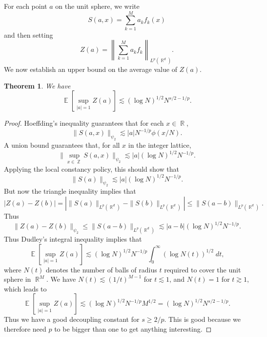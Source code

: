 \documentclass[dvipsnames,letterpaper,12pt]{article}
\numberwithin{equation}{section}
\DeclareMathOperator{\RR}{\mathbb{R}}
\DeclareMathOperator{\ZZ}{\mathbb{Z}}
\newtheorem{theorem}{Theorem}
\numberwithin{theorem}{section}
\DeclareMathOperator{\EE}{\mathbb{E}}
\begin{document}
For each point $a$ on the unit sphere, we write
%
\[ S(a,x) = \sum_{k = 1}^M a_k f_k(x) \]
%
and then setting
%
\[ Z(a) = \left\| \sum_{k = 1}^M a_k f_k \right\|_{L^p(\RR^d)}. \]
%
We now establish an upper bound on the average value of $Z(a)$.

\begin{theorem}
    We have
    \[ \EE[\sup_{|a| = 1} Z(a)] \lesssim (\log N)^{1/2} N^{s/2 - 1/p}. \]
\end{theorem}
\begin{proof}
    Hoeffding's inequality guarantees that for each $x \in \RR$,
    \[ \| S(a,x) \|_{\psi_2} \lesssim |a| N^{-1/p} \phi(x/N). \]
    A union bound guarantees that, for all $x$ in the integer lattice,
    \[ \| \sup_{x \in \ZZ} S(a,x) \|_{\psi_2} \lesssim |a| (\log N)^{1/2} N^{-1/p}. \]
    Applying the local constancy policy, this should show that
    \[ \| S(a) \|_{\psi_2} \lesssim |a| (\log N)^{1/2} N^{-1/p}. \]
    But now the triangle inequality implies that
    \[ |Z(a) - Z(b)| = | \| S(a) \|_{L^p(\RR^d)} - \| S(b) \|_{L^p(\RR^d)} | \leq \| S(a-b) \|_{L^p(\RR^d)}. \]
    Thus 
    \[ \| Z(a) - Z(b) \|_{\psi_2} \leq \| S(a-b) \|_{L^p(\RR^d)} \lesssim |a - b| (\log N)^{1/2} N^{-1/p}. \]
    Thus Dudley's integral inequality implies that
    \[ \EE [ \sup_{|a| = 1} Z(a) ] \lesssim (\log N)^{1/2} N^{-1/p} \int_0^\infty (\log N(t))^{1/2}\; dt, \]
    where $N(t)$ denotes the number of balls of radius $t$ required to cover the unit sphere in $\RR^M$. We have $N(t) \lesssim (1/t)^{M-1}$ for $t \lesssim 1$, and $N(t) = 1$ for $t \gtrsim 1$, which leads to
    \[ \EE [ \sup_{|a| = 1} Z(a) ] \lesssim (\log N)^{1/2} N^{-1/p} M^{1/2} = (\log N)^{1/2} N^{s/2 - 1/p}. \]
    Thus we have a good decoupling constant for $s \geq 2/p$. This is good because we therefore need $p$ to be bigger than one to get anything interesting.
\end{proof}
\end{document}
